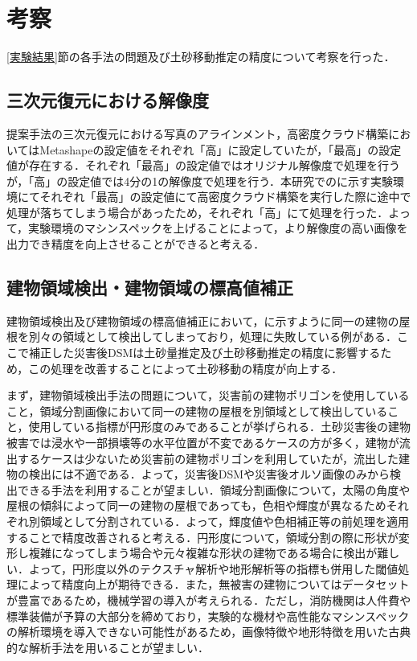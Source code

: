   \section{考察}
    \label{考察}
    \ref{実験結果}節の各手法の問題及び土砂移動推定の精度について考察を行った．


    \subsection*{三次元復元における解像度}
      提案手法の三次元復元における写真のアラインメント，高密度クラウド構築においてはMetashapeの設定値をそれぞれ「高」に設定していたが，「最高」の設定値が存在する．それぞれ「最高」の設定値ではオリジナル解像度で処理を行うが，「高」の設定値では4分の1の解像度で処理を行う．本研究でのに示す実験環境にてそれぞれ「最高」の設定値にて高密度クラウド構築を実行した際に途中で処理が落ちてしまう場合があったため，それぞれ「高」にて処理を行った．よって，実験環境のマシンスペックを上げることによって，より解像度の高い画像を出力でき精度を向上させることができると考える．


    \subsection*{建物領域検出・建物領域の標高値補正}
      建物領域検出及び建物領域の標高値補正において，に示すように同一の建物の屋根を別々の領域として検出してしまっており，処理に失敗している例がある．ここで補正した災害後DSMは土砂量推定及び土砂移動推定の精度に影響するため，この処理を改善することによって土砂移動の精度が向上する．
      
      まず，建物領域検出手法の問題について，災害前の建物ポリゴンを使用していること，領域分割画像において同一の建物の屋根を別領域として検出していること，使用している指標が円形度のみであることが挙げられる．土砂災害後の建物被害では浸水や一部損壊等の水平位置が不変であるケースの方が多く，建物が流出するケースは少ないため災害前の建物ポリゴンを利用していたが，流出した建物の検出には不適である．よって，災害後DSMや災害後オルソ画像のみから検出できる手法を利用することが望ましい．領域分割画像について，太陽の角度や屋根の傾斜によって同一の建物の屋根であっても，色相や輝度が異なるためそれぞれ別領域として分割されている．よって，輝度値や色相補正等の前処理を適用することで精度改善されると考える．円形度について，領域分割の際に形状が変形し複雑になってしまう場合や元々複雑な形状の建物である場合に検出が難しい．よって，円形度以外のテクスチャ解析や地形解析等の指標も併用した閾値処理によって精度向上が期待できる．また，無被害の建物についてはデータセットが豊富であるため，機械学習の導入が考えられる．ただし，消防機関は人件費や標準装備が予算の大部分を締めており，実験的な機材や高性能なマシンスペックの解析環境を導入できない可能性があるため，画像特徴や地形特徴を用いた古典的な解析手法を用いることが望ましい\cite{消防白書}．

